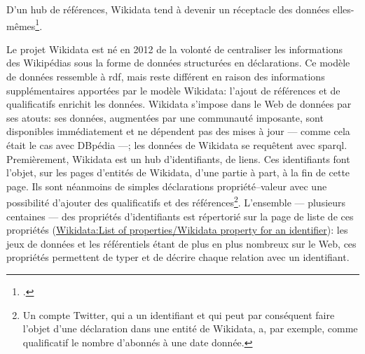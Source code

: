 \begin{citationLongue}
	D’un hub de références, Wikidata tend à devenir un réceptacle des données elles-mêmes\footcite{poupeau_au-a_2018}.
\end{citationLongue}
\medskip

Le projet Wikidata est né en 2012 de la volonté de centraliser les informations des Wikipédias sous la forme de données structurées en déclarations. Ce modèle de données ressemble à \ac{rdf}, mais reste différent en raison des informations supplémentaires apportées par le modèle Wikidata: l'ajout de références et de qualificatifs enrichit les données. Wikidata s'impose dans le Web de données par ses atouts: ses données, augmentées par une communauté imposante, sont disponibles immédiatement et ne dépendent pas des mises à jour --- comme cela était le cas avec DBpédia ---; les données de Wikidata se requêtent avec \ac{sparql}.\\

Premièrement, Wikidata est un hub d'identifiants, de liens. Ces identifiants font l'objet, sur les pages d'entités de Wikidata, d'une partie à part, à la fin de cette page. Ils sont néanmoins de simples déclarations propriété--valeur avec une possibilité d'ajouter des qualificatifs et des références\footnote{Un compte Twitter, qui a un identifiant et qui peut par conséquent faire l'objet d'une déclaration dans une entité de Wikidata, a, par exemple, comme qualificatif le nombre d'abonnés à une date donnée.}.
L'ensemble --- plusieurs centaines --- des propriétés d'identifiants est répertorié sur la page de liste de ces propriétés (\href{https://www.wikidata.org/wiki/Wikidata:List_of_properties/Wikidata_property_for_an_identifier}{Wikidata:List of properties/Wikidata property for an identifier}): les jeux de données et les référentiels étant de plus en plus nombreux sur le Web, ces propriétés permettent de typer et de décrire chaque relation avec un identifiant.\\

